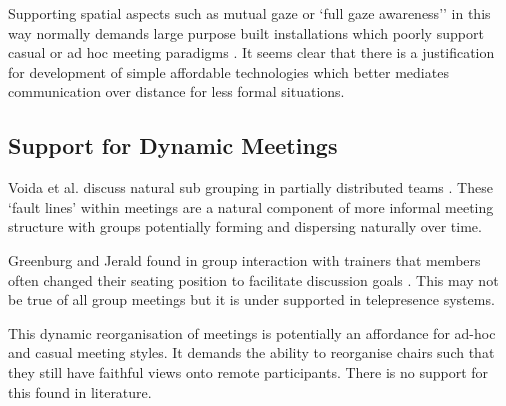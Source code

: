             Supporting spatial aspects such as mutual gaze or `full gaze awareness'' \cite{Monk2002} in this way normally demands large purpose built installations which poorly support casual or ad hoc meeting paradigms \cite{Schroeder2001, Wolff2008}. It seems clear that there is a justification for development of simple affordable technologies which better mediates communication over distance for less formal situations.           


\subsection{Support for Dynamic Meetings}
Voida et al. discuss natural sub grouping in partially distributed teams \cite{Voida2012}. These `fault lines' within meetings are a natural component of more informal meeting structure with groups potentially forming and dispersing naturally over time. \par           
Greenburg and Jerald found in group interaction with trainers that members often changed their seating position to facilitate discussion goals \cite{greenberg1976role}. This may not be true of all group meetings but it is under supported in telepresence systems.\par
            This dynamic reorganisation of meetings is potentially an affordance for ad-hoc and casual meeting styles. It demands the ability to reorganise chairs such that they still have faithful views onto remote participants. There is no support for this found in literature.\par


